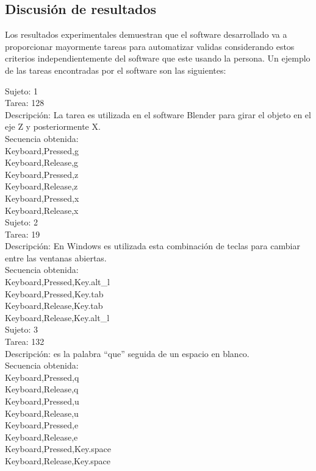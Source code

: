 \subsection{Discusi\'{o}n de resultados}

Los resultados experimentales demuestran que el software desarrollado va a proporcionar mayormente tareas para automatizar validas considerando estos criterios independientemente del software que este usando la persona.
Un ejemplo de las tareas encontradas por el software son las siguientes:

Sujeto: 1	\\
Tarea: 128	\\
Descripci\'on: La tarea es utilizada en el software Blender para girar el objeto en el eje Z y posteriormente X.	\\
Secuencia obtenida:\\
Keyboard,Pressed,g\\
Keyboard,Release,g\\
Keyboard,Pressed,z\\
Keyboard,Release,z\\
Keyboard,Pressed,x\\
Keyboard,Release,x\\

Sujeto: 2	\\
Tarea: 19	\\
Descripci\'on: En Windows es utilizada esta combinaci\'on de teclas para cambiar entre las ventanas abiertas.	\\
Secuencia obtenida:\\
Keyboard,Pressed,Key.alt\_l	\\
Keyboard,Pressed,Key.tab	\\
Keyboard,Release,Key.tab	\\
Keyboard,Release,Key.alt\_l	\\

Sujeto: 3	\\
Tarea: 132	\\
Descripci\'on: es la palabra ``que'' seguida de un espacio en blanco.	\\
Secuencia obtenida:\\
Keyboard,Pressed,q	\\
Keyboard,Release,q	\\
Keyboard,Pressed,u	\\
Keyboard,Release,u	\\
Keyboard,Pressed,e	\\
Keyboard,Release,e	\\
Keyboard,Pressed,Key.space	\\
Keyboard,Release,Key.space	\\

